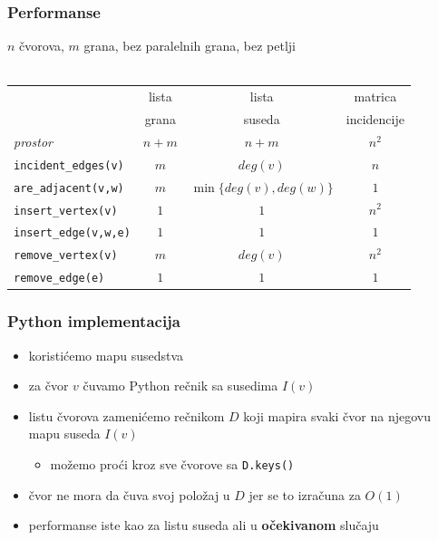 \documentclass[compress,aspectratio=169]{beamer}
\begin{document}
\begin{frame}[fragile]
  \frametitle{Performanse}
    $n$ čvorova, $m$ grana, bez paralelnih grana, bez petlji \\ \ \\
  \begin{tabular}{l|c|c|c}
     & lista & lista & matrica \\
     & grana & suseda & incidencije \\ \hline     
    \textit{prostor} & $n+m$ & $n+m$ & $n^2$ \\ \hline
    \texttt{incident\_edges(v)} & $m$ & $deg(v)$ & $n$ \\ \hline
    \texttt{are\_adjacent(v,w)} & $m$ & $\min\{deg(v),deg(w)\}$ & $1$ \\ \hline
    \texttt{insert\_vertex(v)} & $1$ & $1$ & $n^2$ \\ \hline
    \texttt{insert\_edge(v,w,e)} & $1$ & $1$ & $1$ \\ \hline
    \texttt{remove\_vertex(v)} & $m$ & $deg(v)$ & $n^2$ \\ \hline
    \texttt{remove\_edge(e)} & $1$ & $1$ & $1$ \\
  \end{tabular}
\end{frame}

\begin{frame}[fragile]
  \frametitle{Python implementacija}
  \begin{itemize}
    \item koristićemo mapu susedstva
    \item za čvor $v$ čuvamo Python rečnik sa susedima $I(v)$
    \item listu čvorova zamenićemo rečnikom $D$ koji mapira svaki čvor 
      na njegovu mapu suseda $I(v)$
    \begin{itemize}
      \item možemo proći kroz sve čvorove sa \texttt{D.keys()}
    \end{itemize}
    \item čvor ne mora da čuva svoj položaj u $D$ jer se to izračuna za 
      $O(1)$
    \item performanse iste kao za listu suseda ali u \textbf{očekivanom}
      slučaju
  \end{itemize}
\end{frame}
\end{document}
